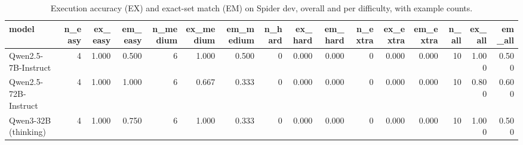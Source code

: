 \begin{table}[htbp]
\caption{Execution accuracy (EX) and exact-set match (EM) on Spider dev, overall and per difficulty, with example counts.}
\label{tab:task1_accuracy}
\begin{tabular}{lrrrrrrrrrrrrrrr}
\toprule
model & n\_easy & ex\_easy & em\_easy & n\_medium & ex\_medium & em\_medium & n\_hard & ex\_hard & em\_hard & n\_extra & ex\_extra & em\_extra & n\_all & ex\_all & em\_all \\
\midrule
Qwen2.5-7B-Instruct & 4 & 1.000 & 0.500 & 6 & 1.000 & 0.500 & 0 & 0.000 & 0.000 & 0 & 0.000 & 0.000 & 10 & 1.000 & 0.500 \\
Qwen2.5-72B-Instruct & 4 & 1.000 & 1.000 & 6 & 0.667 & 0.333 & 0 & 0.000 & 0.000 & 0 & 0.000 & 0.000 & 10 & 0.800 & 0.600 \\
Qwen3-32B (thinking) & 4 & 1.000 & 0.750 & 6 & 1.000 & 0.333 & 0 & 0.000 & 0.000 & 0 & 0.000 & 0.000 & 10 & 1.000 & 0.500 \\
\bottomrule
\end{tabular}
\end{table}
